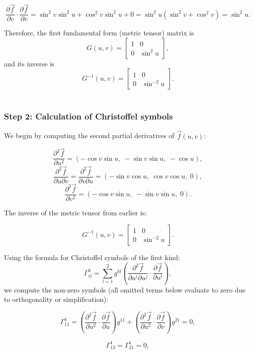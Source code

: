 \documentclass{article}
\begin{document}
		\[
		\frac{\partial \vec{f}}{\partial v} \cdot \frac{\partial \vec{f}}{\partial v} 
		= \sin^2 v \sin^2 u + \cos^2 v \sin^2 u + 0 = \sin^2 u (\sin^2 v + \cos^2 v) = \sin^2 u.
		\]
		
		Therefore, the first fundamental form (metric tensor) matrix is
		\[
		G(u,v) = 
		\begin{bmatrix}
			1 & 0 \\
			0 & \sin^2 u
		\end{bmatrix},
		\]
		and its inverse is
		\[
		G^{-1}(u,v) = 
		\begin{bmatrix}
			1 & 0 \\
			0 & \sin^{-2} u
		\end{bmatrix}.
		\]
		\\
		
		\subsubsection{Step 2: Calculation of Christoffel symbols}
		We begin by computing the second partial derivatives of \(\vec{f}(u, v)\):
		
		\[
		\frac{\partial^2 \vec{f}}{\partial u^2} = (-\cos v \sin u,\; -\sin v \sin u,\; -\cos u),
		\]
		\[
		\frac{\partial^2 \vec{f}}{\partial u \partial v} = \frac{\partial^2 \vec{f}}{\partial v \partial u} 
		= (-\sin v \cos u,\; \cos v \cos u,\; 0),
		\]
		\[
		\frac{\partial^2 \vec{f}}{\partial v^2} = (-\cos v \sin u,\; -\sin v \sin u,\; 0).
		\]
		
		The inverse of the metric tensor from earlier is:
		
		\[
		G^{-1}(u,v) = 
		\begin{bmatrix}
			1 & 0 \\
			0 & \sin^{-2} u
		\end{bmatrix}.
		\]
		
		Using the formula for Christoffel symbols of the first kind:
		\[
		\Gamma^k_{ij} = \sum_{l=1}^{2} g^{kl} \left( \frac{\partial^2 \vec{f}}{\partial u^i \partial u^j} \cdot \frac{\partial \vec{f}}{\partial u^l} \right),
		\]
		we compute the non-zero symbols (all omitted terms below evaluate to zero due to orthogonality or simplification):
		
		\[
		\Gamma^1_{11} = 
		\left( \frac{\partial^2 \vec{f}}{\partial u^2} \cdot \frac{\partial \vec{f}}{\partial u} \right) g^{11}
		+ \left( \frac{\partial^2 \vec{f}}{\partial u^2} \cdot \frac{\partial \vec{f}}{\partial v} \right) g^{21} = 0,
		\]
		
		\[
		\Gamma^1_{12} = \Gamma^1_{21} = 0,
		\]
		
\end{document}
